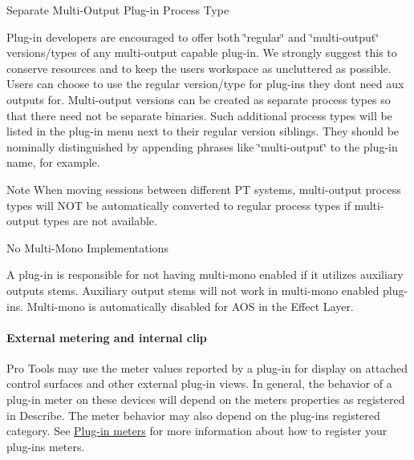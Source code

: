 \begin{DoxyItemize}
\item  Separate Multi-\/\+Output Plug-\/in Process Type

Plug-\/in developers are encouraged to offer both \char`\"{}regular\char`\"{} and \char`\"{}multi-\/output\char`\"{} versions/types of any multi-\/output capable plug-\/in. We strongly suggest this to conserve resources and to keep the user\textquotesingle{}s workspace as uncluttered as possible. Users can choose to use the regular version/type for plug-\/ins they don\textquotesingle{}t need aux outputs for. Multi-\/output versions can be created as separate process types so that there need not be separate binaries. Such additional process types will be listed in the plug-\/in menu next to their regular version siblings. They should be nominally distinguished by appending phrases like \char`\"{}multi-\/output\char`\"{} to the plug-\/in name, for example.

\begin{DoxyNote}{Note}
When moving sessions between different P\+T systems, multi-\/output process types will N\+O\+T be automatically converted to regular process types if multi-\/output types are not available.
\end{DoxyNote}



\item  No Multi-\/\+Mono Implementations

A plug-\/in is responsible for not having multi-\/mono enabled if it utilizes auxiliary outputs stems. Auxiliary output stems will not work in multi-\/mono enabled plug-\/ins. Multi-\/mono is automatically disabled for A\+O\+S in the Effect Layer. 
\end{DoxyItemize}

\hypertarget{a00360_subsubsection__external_metering_and_internal_clip_}{}\paragraph{External metering and internal clip}\label{a00360_subsubsection__external_metering_and_internal_clip_}
 Pro Tools may use the meter values reported by a plug-\/in for display on attached control surfaces and other external plug-\/in views. In general, the behavior of a plug-\/in meter on these devices will depend on the meter\textquotesingle{}s properties as registered in Describe. The meter behavior may also depend on the plug-\/in\textquotesingle{}s registered category. See \hyperlink{a00337}{Plug-\/in meters} for more information about how to register your plug-\/in\textquotesingle{}s meters.


